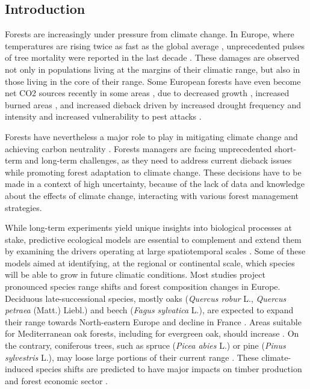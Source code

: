 \rmfamily

\newpage

\subsection{Introduction}

Forests are increasingly under pressure from climate change. In Europe, where temperatures are rising twice as fast as the global average \citep{CCCS2024}, unprecedented pulses of tree mortality were reported in the last decade \citep{Senf2020}. These damages are observed not only in populations living at the margins of their climatic range, but also in those living in the core of their range. Some European forests have even become net CO2 sources recently  in some areas \citep{Hadden2016, Karelin2021}, due to decreased growth \citep{Hadden2016, Woude2023}, increased burned areas \citep{Carnicer2022, Kelly2024}, and increased dieback driven by increased drought frequency and intensity and increased vulnerability to pest attacks \citep{Karelin2021, Cienciala2024, Latifovic2024}.

Forests have nevertheless a major role to play in mitigating climate change and achieving carbon neutrality \citep{Korosuo2023, Hyyrynen2023}. Forests managers are facing unprecedented short-term and long-term challenges, as they need to address current dieback issues while promoting forest adaptation to climate change. These decisions have to be made in a context of high uncertainty, because of the lack of data and knowledge about the effects of climate change, interacting with various forest management strategies.

While long-term experiments yield unique insights into biological processes at stake, predictive ecological models are essential to complement and extend them by examining the drivers operating at large spatiotemporal scales \citep{Levins1993, Mitchell2006}. Some of these models aimed at identifying, at the regional or continental scale, which species will be able to grow in future climatic conditions. Most studies project pronounced species range shifts and forest composition changes in Europe. Deciduous late-successional species, mostly oaks (\emph{Quercus robur} L., \emph{Quercus petraea} (Matt.) Liebl.) and beech (\emph{Fagus sylvatica} L.), are expected to expand their range towards North-eastern Europe and decline in France \citep{Hickler2012, Hanewinkel2013, Saltre2015, Schueler2014, Dyderski2018, Takolander2019, Wessely2024}. Areas suitable for Mediterranean oak forests, including for evergreen oak, should increase \citep{Ohlemueller2006, Hanewinkel2013, Takolander2019}. On the contrary, coniferous trees, such as spruce (\emph{Picea abies} L.) or pine (\emph{Pinus sylvestris} L.), may loose large portions of their current range \citep{Hanewinkel2013, Schueler2014, Wessely2024}. These climate-induced species shifts are predicted to have major impacts on timber production and forest economic sector \citep{Hanewinkel2013, Wessely2024}. 

